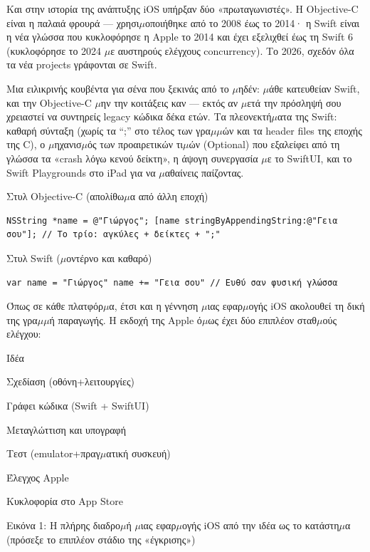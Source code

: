 
Και στην ιστορία της ανάπτυξης iOS υπήρξαν δύο «πρωταγωνιστές». Η Objective-C είναι η παλαιά φρουρά — χρησι$\mu$οποιήθηκε από το 2008 έως το 2014· η Swift είναι η νέα γλώσσα που κυκλοφόρησε η Apple το 2014 και έχει εξελιχθεί έως τη Swift 6 (κυκλοφόρησε το 2024 $\mu$ε αυστηρούς ελέγχους concurrency). Το 2026, σχεδόν όλα τα νέα projects γράφονται σε Swift.

Μια ειλικρινής κουβέντα για σένα που ξεκινάς από το $\mu$ηδέν: $\mu$άθε κατευθείαν Swift, και την Objective-C $\mu$ην την κοιτάξεις καν — εκτός αν $\mu$ετά την πρόσληψή σου χρειαστεί να συντηρείς legacy κώδικα δέκα ετών. Τα πλεονεκτή$\mu$ατα της Swift: καθαρή σύνταξη (χωρίς τα “;” στο τέλος των γρα$\mu$$\mu$ών και τα header files της εποχής της C), ο $\mu$ηχανισ$\mu$ός των προαιρετικών τι$\mu$ών (Optional) που εξαλείφει από τη γλώσσα τα «crash λόγω κενού δείκτη», η άψογη συνεργασία $\mu$ε το SwiftUI, και το Swift Playgrounds στο iPad για να $\mu$αθαίνεις παίζοντας.

Στυλ Objective-C (απολίθω$\mu$α από άλλη εποχή)

\begin{lstlisting}
NSString *name = @"Γιώργος"; [name stringByAppendingString:@"Γεια σου"]; // Το τρίο: αγκύλες + δείκτες + ";"
\end{lstlisting}

Στυλ Swift ($\mu$οντέρνο και καθαρό)

\begin{lstlisting}
var name = "Γιώργος" name += "Γεια σου" // Ευθύ σαν φυσική γλώσσα
\end{lstlisting}


Όπως σε κάθε πλατφόρ$\mu$α, έτσι και η γέννηση $\mu$ιας εφαρ$\mu$ογής iOS ακολουθεί τη δική της γρα$\mu$$\mu$ή παραγωγής. Η εκδοχή της Apple ό$\mu$ως έχει δύο επιπλέον σταθ$\mu$ούς ελέγχου:

Ιδέα

Σχεδίαση (οθόνη+λειτουργίες)

Γράφει κώδικα (Swift + SwiftUI)

Μεταγλώττιση και υπογραφή

Τεστ (emulator+πραγ$\mu$ατική συσκευή)

Έλεγχος Apple

Κυκλοφορία στο App Store

\begin{center}\small\color{gray}Εικόνα 1: Η πλήρης διαδρο$\mu$ή $\mu$ιας εφαρ$\mu$ογής iOS από την ιδέα ως το κατάστη$\mu$α (πρόσεξε το επιπλέον στάδιο της «έγκρισης»)\end{center}

